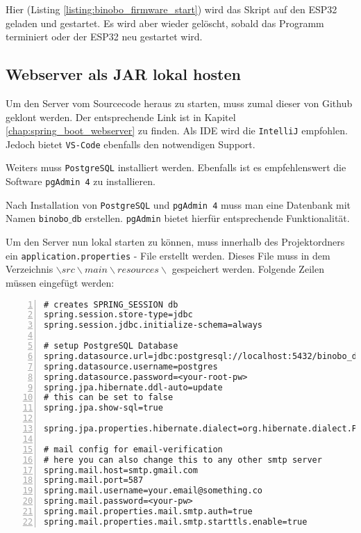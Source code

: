 \documentclass[paper=a4,12pt]{scrreprt}
\begin{document}
Hier (Listing \ref{listing:binobo_firmware_start}) wird das Skript auf den ESP32 geladen und gestartet. Es wird aber wieder gelöscht, sobald das Programm terminiert oder der ESP32 neu gestartet wird.\newline

\subsection{Webserver als JAR lokal hosten}

Um den Server vom Sourcecode heraus zu starten, muss zumal dieser von Github geklont werden. Der entsprechende Link ist in Kapitel \ref{chap:spring_boot_webserver} zu finden.\newline
Als IDE wird die \texttt{IntelliJ} empfohlen. Jedoch bietet \texttt{VS-Code} ebenfalls den notwendigen Support.\newline


Weiters muss \texttt{PostgreSQL} installiert werden. Ebenfalls ist es empfehlenswert die Software \texttt{pgAdmin 4} zu installieren.\newline

Nach Installation von \texttt{PostgreSQL} und \texttt{pgAdmin 4} muss man eine Datenbank mit Namen \texttt{binobo$\_$db} erstellen. \texttt{pgAdmin} bietet hierfür entsprechende Funktionalität.\newline

Um den Server nun lokal starten zu können, muss innerhalb des Projektordners ein \texttt{application.properties} - File erstellt werden. Dieses File muss in dem Verzeichnis \texttt{$\backslash src\backslash main\backslash resources\backslash$} gespeichert werden. Folgende Zeilen müssen eingefügt werden:\newline

\begin{lstlisting}[caption={application.properties}, captionpos=b, label={listing:app_props},  numbers=left, stepnumber=1]
# creates SPRING_SESSION db
spring.session.store-type=jdbc
spring.session.jdbc.initialize-schema=always

# setup PostgreSQL Database
spring.datasource.url=jdbc:postgresql://localhost:5432/binobo_db
spring.datasource.username=postgres
spring.datasource.password=<your-root-pw>
spring.jpa.hibernate.ddl-auto=update
# this can be set to false
spring.jpa.show-sql=true

spring.jpa.properties.hibernate.dialect=org.hibernate.dialect.PostgreSQL92Dialect

# mail config for email-verification
# here you can also change this to any other smtp server
spring.mail.host=smtp.gmail.com
spring.mail.port=587
spring.mail.username=your.email@something.co
spring.mail.password=<your-pw>
spring.mail.properties.mail.smtp.auth=true
spring.mail.properties.mail.smtp.starttls.enable=true
\end{lstlisting}
\end{document}
